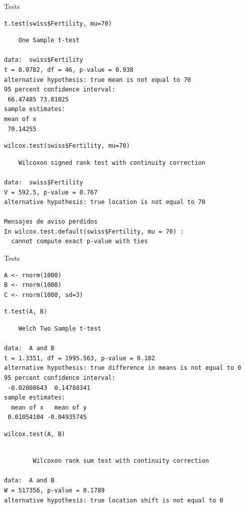 \documentclass[xcolor={usenames,svgnames,dvipsnames}]{beamer}
\begin{document}
\begin{frame}[fragile,label=sec-2-5]{Tests}
 \lstset{language=R,numbers=none}
\begin{lstlisting}
t.test(swiss$Fertility, mu=70)
\end{lstlisting}

\begin{verbatim}
	One Sample t-test

data:  swiss$Fertility
t = 0.0782, df = 46, p-value = 0.938
alternative hypothesis: true mean is not equal to 70
95 percent confidence interval:
 66.47485 73.81025
sample estimates:
mean of x 
 70.14255
\end{verbatim}

\lstset{language=R,numbers=none}
\begin{lstlisting}
wilcox.test(swiss$Fertility, mu=70)
\end{lstlisting}

\begin{verbatim}
	Wilcoxon signed rank test with continuity correction

data:  swiss$Fertility
V = 592.5, p-value = 0.767
alternative hypothesis: true location is not equal to 70

Mensajes de aviso perdidos
In wilcox.test.default(swiss$Fertility, mu = 70) :
  cannot compute exact p-value with ties
\end{verbatim}
\end{frame}
\begin{frame}[fragile,label=sec-2-6]{Tests}
 \lstset{language=R,numbers=none}
\begin{lstlisting}
A <- rnorm(1000)
B <- rnorm(1000)
C <- rnorm(1000, sd=3)
\end{lstlisting}

\lstset{language=R,numbers=none}
\begin{lstlisting}
t.test(A, B)
\end{lstlisting}

\begin{verbatim}
	Welch Two Sample t-test

data:  A and B
t = 1.3351, df = 1995.563, p-value = 0.182
alternative hypothesis: true difference in means is not equal to 0
95 percent confidence interval:
 -0.02808643  0.14788341
sample estimates:
  mean of x   mean of y 
 0.01054104 -0.04935745
\end{verbatim}

\lstset{language=R,numbers=none}
\begin{lstlisting}
wilcox.test(A, B)
\end{lstlisting}

\begin{verbatim}

        Wilcoxon rank sum test with continuity correction

data:  A and B
W = 517356, p-value = 0.1789
alternative hypothesis: true location shift is not equal to 0
\end{verbatim}
\end{frame}
\end{document}
